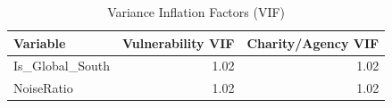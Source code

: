 \begin{table}[ht]
\centering
\begin{tabular}{lrr}
  \hline
Variable & Vulnerability VIF & Charity/Agency VIF \\ 
  \hline
Is\_Global\_South & 1.02 & 1.02 \\ 
  NoiseRatio & 1.02 & 1.02 \\ 
   \hline
\end{tabular}
\caption{Variance Inflation Factors (VIF)} 
\end{table}
